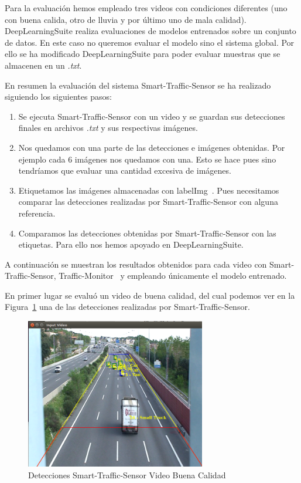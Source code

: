 Para la evaluación hemos empleado tres videos con condiciones diferentes (uno con buena calida, otro de lluvia y por último uno de mala calidad). DeepLearningSuite realiza evaluaciones de modelos entrenados sobre un conjunto de datos. En este caso no queremos evaluar el modelo sino el sistema global. Por ello se ha modificado DeepLearningSuite para poder evaluar muestras que se almacenen en un \textit{.txt}. 

En resumen la evaluación del sistema Smart-Traffic-Sensor se ha realizado siguiendo los siguientes pasos:

\begin{enumerate}
    \item Se ejecuta Smart-Traffic-Sensor con un video y se guardan sus detecciones finales en archivos \textit{.txt} y sus respectivas imágenes.
    \item Nos quedamos con una parte de las detecciones e imágenes obtenidas. Por ejemplo cada 6 imágenes nos quedamos con una. Esto se hace pues sino tendríamos que evaluar una cantidad excesiva de imágenes.
    \item Etiquetamos las imágenes almacenadas con labelImg~\cite{labelimg}. Pues necesitamos comparar las detecciones realizadas por Smart-Traffic-Sensor con alguna referencia.
    \item Comparamos las detecciones obtenidas por Smart-Traffic-Sensor con las etiquetas. Para ello nos hemos apoyado en DeepLearningSuite.
\end{enumerate}


A continuación se muestran los resultados obtenidos para cada video con Smart-Traffic-Sensor, Traffic-Monitor~\cite{redo_tesis} y empleando únicamente el modelo entrenado.

En primer lugar se evaluó un video de buena calidad, del cual podemos ver en la Figura~\ref{fig.video_buena_calidad} una de las detecciones realizadas por Smart-Traffic-Sensor.

\begin{figure}
\begin{center}
	\includegraphics[width=0.7\textwidth]{figures/Experimentos/sts_buena.png}
   \caption{Detecciones Smart-Traffic-Sensor Video Buena Calidad}
	\label{fig.video_buena_calidad}
\end{center}
\end{figure}


